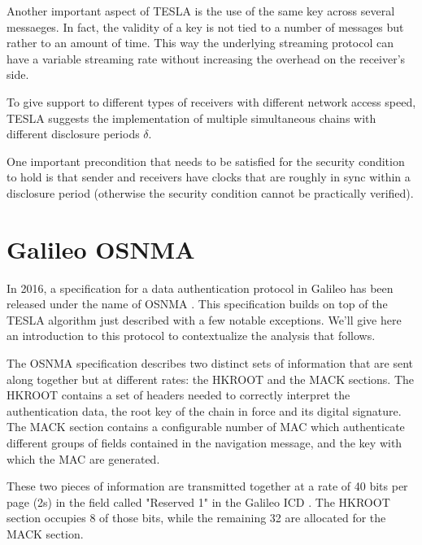 Another important aspect of TESLA is the use of the same key across several
messaeges. In fact, the validity of a key is not tied to a number of messages
but rather to an amount of time. This way the underlying streaming protocol can
have a variable streaming rate without increasing the overhead on the receiver's
side.

To give support to different types of receivers with different network access
speed, TESLA suggests the implementation of multiple simultaneous chains with
different disclosure periods $\delta$.

One important precondition that needs to be satisfied for the security condition
to hold is that sender and receivers have clocks that are roughly in sync within
a disclosure period (otherwise the security condition cannot be practically
verified).

\section{Galileo OSNMA}
In 2016, a specification for a data authentication protocol in Galileo has been
released under the name of OSNMA \cite{osnma}. This specification builds on top
of the TESLA algorithm just described with a few notable exceptions. We'll give
here an introduction to this protocol to contextualize the analysis that
follows.

\par

The OSNMA specification describes two distinct sets of information that are sent
along together but at different rates: the HKROOT and the MACK sections. The
HKROOT contains a set of headers needed to correctly interpret the
authentication data, the root key of the chain in force and its digital
signature. The MACK section contains a configurable number of MAC which
authenticate different groups of fields contained in the navigation message, and
the key with which the MAC are generated.

These two pieces of information are transmitted together at a rate of 40 bits
per page (2s) in the field called "Reserved 1" in the Galileo ICD
\cite{galileoicd}. The HKROOT section occupies 8 of those bits, while the
remaining 32 are allocated for the MACK section.

